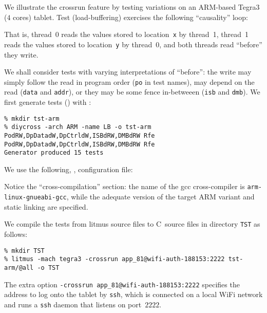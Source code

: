 We illustrate the crossrun feature by testing  variations on
an ARM-based Tegra3 ($4$ cores) tablet.
Test  (load-buffering) exercises
the following ``causality'' loop:
\begin{center}\end{center}
That is, thread~0 reads the values stored to location~\texttt{x} by thread~1,
thread~1 reads the values stored to location~\texttt{y} by thread~0,
and both threads read ``before'' they write.

We shall consider tests with varying interpretations of ``before'':
the write may simply follow the read in program order
(\texttt{po} in test names),
may depend on the read (\texttt{data} and \texttt{addr}), or
they may be some fence in-betweeen
(\texttt{isb} and \texttt{dmb}).
We first generate tests %
\ifhevea{} () \fi
with :
\begin{verbatim}
% mkdir tst-arm
% diycross -arch ARM -name LB -o tst-arm PodRW,DpDatadW,DpCtrldW,ISBdRW,DMBdRW Rfe PodRW,DpDatadW,DpCtrldW,ISBdRW,DMBdRW Rfe
Generator produced 15 tests
\end{verbatim}

We use the following, , configuration file:

Notice the ``cross-compilation'' section:
the name of the gcc cross-compiler is \texttt{arm-linux-gnueabi-gcc},
while the adequate version of the target ARM variant
and static linking are specified.

We compile the tests from litmus source files to C~source files in
directory \texttt{TST} as follows:
\begin{verbatim}
% mkdir TST
% litmus -mach tegra3 -crossrun app_81@wifi-auth-188153:2222 tst-arm/@all -o TST
\end{verbatim}
The extra option \texttt{-crossrun app\_81@wifi-auth-188153:2222}
specifies the address to log onto the tablet by \texttt{ssh},
which is connected on a local WiFi network and runs a \texttt{ssh} daemon
that listens on port~$2222$.

